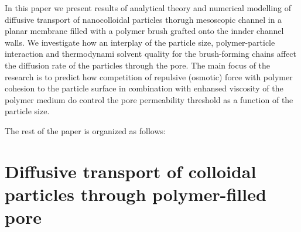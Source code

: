 \documentclass[12pt, a4paper]{article}
\begin{document}
In this paper we present results of analytical theory and numerical modelling of 
diffusive transport of nanocolloidal particles
thorugh mesoscopic channel in a planar membrane filled with a polymer brush grafted onto the innder channel walls. We investigate how an interplay of the particle size,
polymer-particle interaction and thermodynami solvent quality for the brush-forming chains affect the diffusion rate of the particles through the pore. 
The main focus of the research is to predict how competition of repulsive (osmotic) force with polymer cohesion to the particle surface in combination with
enhansed viscosity of the polymer medium do control the  pore permeability threshold as a function of the particle size.


The rest of the paper is organized as follows: 




\section{Diffusive transport of colloidal particles through polymer-filled pore}
\end{document}
